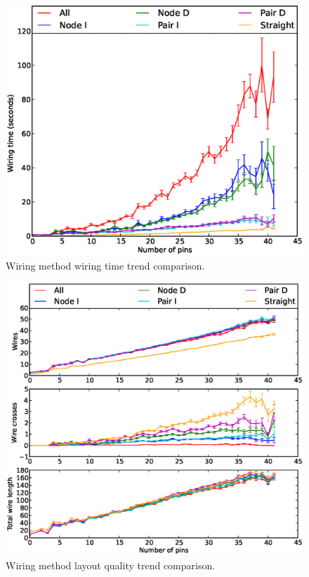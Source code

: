 \begin{figure}[H]
\begin{center}
\includegraphics[width=\textwidth]{Images/wiring_time_trend_comparison.eps}
\caption[Wiring method wiring time trend comparison]{Wiring method wiring time
trend comparison.}
\label{fig:wiring_time_trend}
\end{center}
\end{figure}

\begin{figure}[H]
\begin{center}
\includegraphics[width=\textwidth]{Images/wiring_quality_trend_comparison.eps}
\caption[Wiring method layout quality trend comparison]{Wiring method layout
quality trend comparison.}
\label{fig:wiring_quality_trend}
\end{center}
\end{figure}

